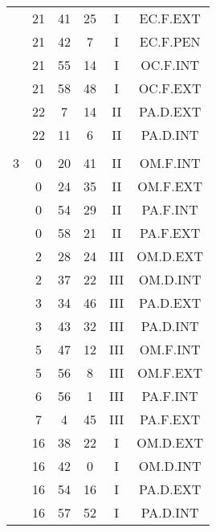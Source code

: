 \documentclass[12pt, a4paper]{article}
\begin{document}
\begin{multicols}{3}
{\begin{tabular}{c c c c c c}
	 	 	 	 & 21 & 41 & 25 & I & EC.F.EXT\\%
	 	 	 	 & 21 & 42 & 7 & I & EC.F.PEN\\%
	 	 	 	 & 21 & 55 & 14 & I & OC.F.INT\\%
	 	 	 	 & 21 & 58 & 48 & I & OC.F.EXT\\%
	 	 	 	 & 22 & 7 & 14 & II & PA.D.EXT\\%
	 	 	 	 & 22 & 11 & 6 & II & PA.D.INT\\%
	 	 	 	 & & & & & \\%
	 	 	 	3 & 0 & 20 & 41 & II & OM.F.INT\\%
	 	 	 	 & 0 & 24 & 35 & II & OM.F.EXT\\%
	 	 	 	 & 0 & 54 & 29 & II & PA.F.INT\\%
	 	 	 	 & 0 & 58 & 21 & II & PA.F.EXT\\%
	 	 	 	 & 2 & 28 & 24 & III & OM.D.EXT\\%
	 	 	 	 & 2 & 37 & 22 & III & OM.D.INT\\%
	 	 	 	 & 3 & 34 & 46 & III & PA.D.EXT\\%
	 	 	 	 & 3 & 43 & 32 & III & PA.D.INT\\%
	 	 	 	 & 5 & 47 & 12 & III & OM.F.INT\\%
	 	 	 	 & 5 & 56 & 8 & III & OM.F.EXT\\%
	 	 	 	 & 6 & 56 & 1 & III & PA.F.INT\\%
	 	 	 	 & 7 & 4 & 45 & III & PA.F.EXT\\%
	 	 	 	 & 16 & 38 & 22 & I & OM.D.EXT\\%
	 	 	 	 & 16 & 42 & 0 & I & OM.D.INT\\%
	 	 	 	 & 16 & 54 & 16 & I & PA.D.EXT\\%
	 	 	 	 & 16 & 57 & 52 & I & PA.D.INT\\%

\end{tabular}}
\end{multicols}
\end{document}
